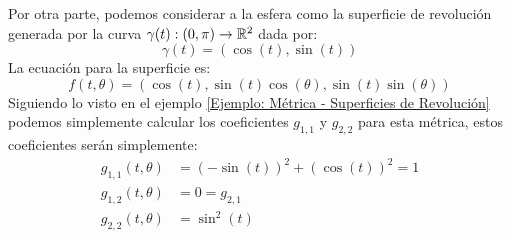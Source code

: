 \begin{example}[Esfera]
	Por otra parte, podemos considerar a la esfera como la superficie de revolución generada por la curva $\gamma(t): (0,\pi) \to \mathbb{R}^{2}$ dada por:
	\[
		\gamma(t) = (\cos(t),\sin(t))
	\]
	La ecuación para la superficie es:
	\[
		f(t,\theta) = (\cos(t), \sin(t)\cos(\theta), \sin(t)\sin(\theta))
	\]
	Siguiendo lo visto en el ejemplo \ref{Ejemplo: Métrica - Superficies de Revolución} podemos simplemente calcular los coeficientes $g_{1,1}$ y $g_{2,2}$ para esta métrica, estos coeficientes serán simplemente:
	\begin{align*}
		g_{1,1}(t,\theta) & = (-\sin(t))^{2} + (\cos(t))^{2} = 1 \\
		g_{1,2}(t,\theta) & = 0 = g_{2,1}                        \\
    g_{2,2}(t,\theta) & = \sin^{2}(t)
	\end{align*}
\end{example}
